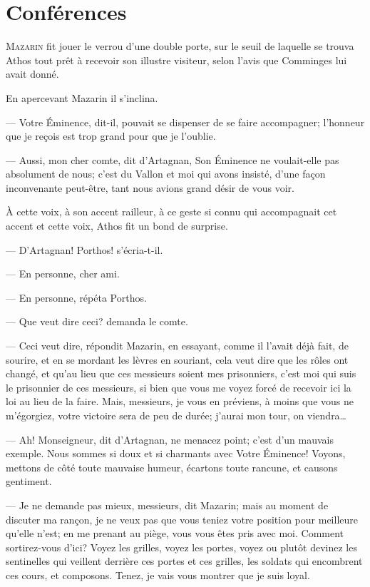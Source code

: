 \chapter{Conférences}

\lettrine{M}{azarin} fit jouer le verrou d'une double porte, sur le seuil de laquelle se trouva Athos tout prêt à recevoir son illustre visiteur, selon l'avis que Comminges lui avait donné.

\zz
En apercevant Mazarin il s'inclina.


\zz
— Votre Éminence, dit-il, pouvait se dispenser de se faire accompagner; l'honneur que je reçois est trop grand pour que je l'oublie.

— Aussi, mon cher comte, dit d'Artagnan, Son Éminence ne voulait-elle pas absolument de nous; c'est du Vallon et moi qui avons insisté, d'une façon inconvenante peut-être, tant nous avions grand désir de vous voir.

À cette voix, à son accent railleur, à ce geste si connu qui accompagnait cet accent et cette voix, Athos fit un bond de surprise.

— D'Artagnan! Porthos! s'écria-t-il.

— En personne, cher ami.

— En personne, répéta Porthos.

— Que veut dire ceci? demanda le comte.

— Ceci veut dire, répondit Mazarin, en essayant, comme il l'avait déjà fait, de sourire, et en se mordant les lèvres en souriant, cela veut dire que les rôles ont changé, et qu'au lieu que ces messieurs soient mes prisonniers, c'est moi qui suis le prisonnier de ces messieurs, si bien que vous me voyez forcé de recevoir ici la loi au lieu de la faire. Mais, messieurs, je vous en préviens, à moins que vous ne m'égorgiez, votre victoire sera de peu de durée; j'aurai mon tour, on viendra\dots

— Ah! Monseigneur, dit d'Artagnan, ne menacez point; c'est d'un mauvais exemple. Nous sommes si doux et si charmants avec Votre Éminence! Voyons, mettons de côté toute mauvaise humeur, écartons toute rancune, et causons gentiment.

— Je ne demande pas mieux, messieurs, dit Mazarin; mais au moment de discuter ma rançon, je ne veux pas que vous teniez votre position pour meilleure qu'elle n'est; en me prenant au piège, vous vous êtes pris avec moi. Comment sortirez-vous d'ici? Voyez les grilles, voyez les portes, voyez ou plutôt devinez les sentinelles qui veillent derrière ces portes et ces grilles, les soldats qui encombrent ces cours, et composons. Tenez, je vais vous montrer que je suis loyal.


